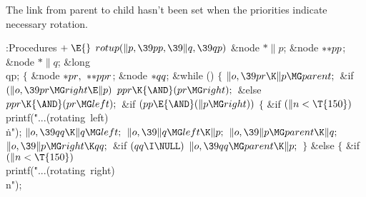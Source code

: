 The link from parent to child hasn't been set when the priorities
indicate necessary rotation.

\Y\B\4:Procedures\X${}\mathrel+\E{}$\6
$\\{rotup}(\|p,\39\\{pp},\39\|q,\39\\{qp}){}$\1\1\6
\&{node} ${}{*}\|p{}$;\6
\&{node} ${}{*}{*}\\{pp}{}$;\6
\&{node} ${}{*}\|q{}$;\6
\&{long} \\{qp};\2\2\6
${}\{{}$\5
\1\&{node} ${}{*}\\{pr},{}$ ${}{*}{*}\\{ppr}{}$;\6
\&{node} ${}{*}\\{qq}{}$;\7
\&{while} ()\5
${}\{{}$\1\6
${}\|o,\39\\{pr}\K\|p\MG\\{parent};{}$\6
\&{if} ${}(\|o,\39\\{pr}\MG\\{right}\E\|p){}$\1\5
${}\\{ppr}\K{\AND}(\\{pr}\MG\\{right});{}$\2\6
\&{else}\1\5
${}\\{ppr}\K{\AND}(\\{pr}\MG\\{left});{}$\2\6
\&{if} ${}(\\{pp}\E{\AND}(\|p\MG\\{right})){}$\5
${}\{{}$\1\6
\&{if} ${}(\|n<\T{150}){}$\1\5
\\{printf}(\.{"...(rotating\ left)\\}\)\.{n"});\2\6
${}\|o,\39\\{qq}\K\|q\MG\\{left};{}$\6
${}\|o,\39\|q\MG\\{left}\K\|p;{}$\6
${}\|o,\39\|p\MG\\{parent}\K\|q;{}$\6
${}\|o,\39\|p\MG\\{right}\K\\{qq};{}$\6
\&{if} ${}(\\{qq}\I\NULL){}$\1\5
${}\|o,\39\\{qq}\MG\\{parent}\K\|p;{}$\2\6
\4${}\}{}$\2\6
\&{else}\5
${}\{{}$\1\6
\&{if} ${}(\|n<\T{150}){}$\1\5
\\{printf}(\.{"...(rotating\ right)}\)\.{\\n"});\2\6
